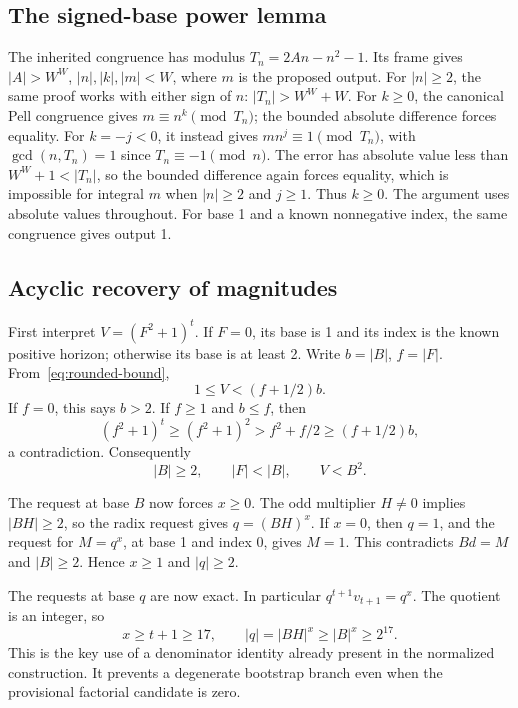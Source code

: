 \documentclass[11pt,letterpaper]{article}
\theoremstyle{remark}\newtheorem{remark}[theorem]{Remark}
\begin{document}
\subsection{The signed-base power lemma}

The inherited congruence has modulus
\(T_n=2An-n^2-1\). Its frame gives
\(|A|>W^W\), \(|n|,|k|,|m|<W\), where \(m\) is the proposed output.
For \(|n|\ge2\), the same proof works with either sign of \(n\):
\(|T_n|>W^W+W\). For \(k\ge0\), the canonical Pell congruence gives
\(m\equiv n^k\pmod{T_n}\); the bounded absolute difference forces equality.
For \(k=-j<0\), it instead gives
\(mn^j\equiv1\pmod{T_n}\), with \(\gcd(n,T_n)=1\) since
\(T_n\equiv-1\pmod n\). The error has absolute value less than
\(W^W+1<|T_n|\), so the bounded difference again forces equality,
which is impossible for integral \(m\) when \(|n|\ge2\) and \(j\ge1\).
Thus \(k\ge0\). The argument uses absolute values throughout. For base 1
and a known nonnegative index, the same congruence gives output 1.

\subsection{Acyclic recovery of magnitudes}

First interpret \(V=(F^2+1)^t\). If \(F=0\), its base is 1 and its index
is the known positive horizon; otherwise its base is at least 2.
Write \(b=|B|\), \(f=|F|\). From~\eqref{eq:rounded-bound},
\begin{equation}\label{eq:basic-magnitude}
 1\le V<(f+1/2)b.
\end{equation}
If \(f=0\), this says \(b>2\). If \(f\ge1\) and \(b\le f\), then
\[
 (f^2+1)^t\ge(f^2+1)^2>f^2+f/2\ge(f+1/2)b,
\]
a contradiction. Consequently
\begin{equation}\label{eq:bootstrap-small}
 |B|\ge2,\qquad |F|<|B|,\qquad V<B^2.
\end{equation}

The request at base \(B\) now forces \(x\ge0\). The odd multiplier
\(H\ne0\) implies \(|BH|\ge2\), so the radix request gives
\(q=(BH)^x\). If \(x=0\), then \(q=1\), and the request for
\(M=q^x\), at base 1 and index 0, gives \(M=1\). This contradicts
\(Bd=M\) and \(|B|\ge2\). Hence \(x\ge1\) and \(|q|\ge2\).

The requests at base \(q\) are now exact. In particular
\(q^{t+1}v_{t+1}=q^x\). The quotient is an integer, so
\begin{equation}\label{eq:xlarge}
 x\ge t+1\ge17,\qquad |q|=|BH|^x\ge|B|^x\ge2^{17}.
\end{equation}
This is the key use of a denominator identity already present in the
normalized construction. It prevents a degenerate bootstrap branch even
when the provisional factorial candidate is zero.
\end{document}
